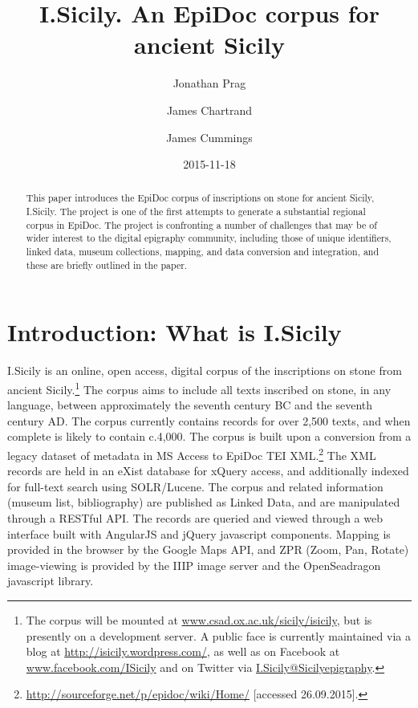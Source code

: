\documentclass[amsthm,ebook]{saparticle}
\title{I.Sicily. An EpiDoc corpus for ancient Sicily}
\author[OXF]{Jonathan Prag\corref{first}}
\author[opensky]{James Chartrand}
\author[OXF]{James Cummings}
\date{2015-11-18}
\begin{document}
\maketitle
\begin{abstract}
This paper introduces the EpiDoc corpus of inscriptions on stone for ancient Sicily, I.Sicily. The project is one of the
first attempts to generate a substantial regional corpus in EpiDoc. The project is confronting a number of challenges
that may be of wider interest to the digital epigraphy community, including those of unique identifiers, linked data,
museum collections, mapping, and data conversion and integration, and these are briefly outlined in the paper.
\end{abstract}




\section{Introduction: What is I.Sicily}
\noindent I.Sicily is an online, open access, digital corpus of the inscriptions on stone from ancient Sicily.\footnote{ The
corpus will be mounted at \url{www.csad.ox.ac.uk/sicily/isicily}, but is presently on a development server. A public face is
currently maintained via a blog at \url{http://isicily.wordpress.com/}, as well as on Facebook at \url{www.facebook.com/ISicily}
and on Twitter via \url{I.Sicily@Sicilyepigraphy}.} The corpus aims to include all texts inscribed on stone, in any language,
between approximately the seventh century BC and the seventh century AD. The corpus currently contains records for over
2,500 texts, and when complete is likely to contain c.4,000. The corpus is built upon a conversion from a legacy
dataset of metadata in MS Access to EpiDoc TEI XML.\footnote{\url{http://sourceforge.net/p/epidoc/wiki/Home/} [accessed
26.09.2015].} The XML records are held in an eXist database for xQuery access, and additionally indexed for full-text
search using SOLR/Lucene. The corpus and related information (museum list, bibliography) are published as Linked Data,
and are manipulated through a RESTful API. The records are queried and viewed through a web interface built with
AngularJS and jQuery javascript components. Mapping is provided in the browser by the Google Maps API, and ZPR (Zoom,
Pan, Rotate) image-viewing is provided by the IIIP image server and the OpenSeadragon javascript library.
\end{document}
